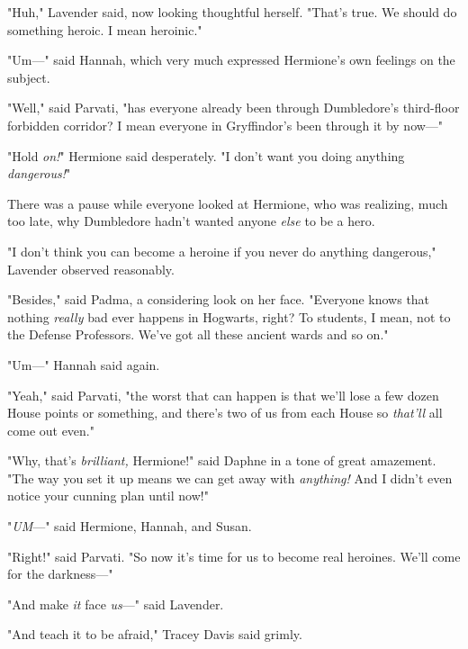 "Huh," Lavender said, now looking thoughtful herself. "That's true. We should 
do something heroic. I mean heroinic."

"Um---" said Hannah, which very much expressed Hermione's own feelings on the 
subject.

"Well," said Parvati, "has everyone already been through Dumbledore's 
third-floor forbidden corridor? I mean everyone in Gryffindor's been through it 
by now---"

"Hold \emph{on!}" Hermione said desperately. "I don't want you doing anything 
\emph{dangerous!}"

There was a pause while everyone looked at Hermione, who was realizing, much 
too late, why Dumbledore hadn't wanted anyone \emph{else} to be a hero.

"I don't think you can become a heroine if you never do anything dangerous," 
Lavender observed reasonably.

"Besides," said Padma, a considering look on her face. "Everyone knows that 
nothing \emph{really} bad ever happens in Hogwarts, right? To students, I mean, 
not to the Defense Professors. We've got all these ancient wards and so on."

"Um---" Hannah said again.

"Yeah," said Parvati, "the worst that can happen is that we'll lose a few dozen 
House points or something, and there's two of us from each House so 
\emph{that'll} all come out even."

"Why, that's \emph{brilliant,} Hermione!" said Daphne in a tone of great 
amazement. "The way you set it up means we can get away with \emph{anything!} 
And I didn't even notice your cunning plan until now!"

"\emph{UM}---" said Hermione, Hannah, and Susan.

"Right!" said Parvati. "So now it's time for us to become real heroines. We'll 
come for the darkness---"

"And make \emph{it} face \emph{us}---" said Lavender.

"And teach it to be afraid," Tracey Davis said grimly.